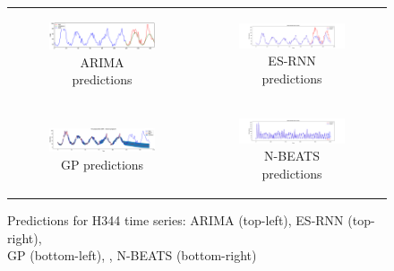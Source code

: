 \documentclass{article}
\begin{document}
\begin{figure}[!h]
  \centering
  \begin{tabular}[c]{cc}
    \begin{subfigure}[c]{0.6\textwidth}
      \includegraphics[width=\textwidth]{H344_ARIMA.eps}
      \caption{ARIMA predictions}
      \label{fig:H344stackpred1}
    \end{subfigure}&
    \begin{subfigure}[c]{0.6\textwidth}
      \includegraphics[width=\textwidth]{H344_esrnn_time_series.png}
      \caption{ES-RNN predictions}
      \label{fig:H344stackpred2}
    \end{subfigure}\\
    \begin{subfigure}[c]{0.5\textwidth}
      \includegraphics[width=\textwidth]{H344_GP_time_series.eps}
      \caption{GP predictions}
      \label{fig:H344stackpred3}
    \end{subfigure}&
    \begin{subfigure}[c]{0.6\textwidth}
      \includegraphics[width=\textwidth]{H344_nbeats_time_series.png}
      \caption{N-BEATS predictions}
      \label{fig:H344stackpred4}
    \end{subfigure}\\
  \end{tabular}    
  \caption{Predictions for H344 time series: ARIMA (top-left), ES-RNN (top-right), \\ GP (bottom-left), , N-BEATS (bottom-right)}
  \label{fig:H344stackpred}
\end{figure}
\end{document}
